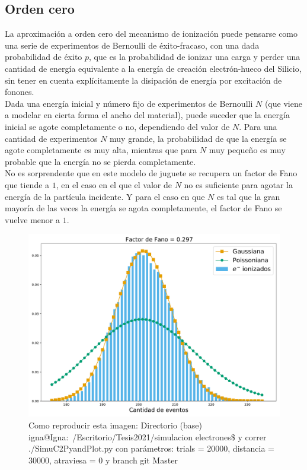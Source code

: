 \subsection{Orden cero}
\noindent La aproximación a orden cero del mecanismo de ionización puede pensarse como una serie de experimentos de Bernoulli de éxito-fracaso, con una dada probabilidad de éxito $p$, que es la probabilidad de ionizar una carga y perder una cantidad de energía equivalente a la energía de creación electrón-hueco del Silicio, sin tener en cuenta explícitamente la disipación de energía por excitación de fonones.\\
\indent Dada una energía inicial y número fijo de experimentos de Bernoulli $N$ (que viene a modelar en cierta forma el ancho del material), puede suceder que la energía inicial se agote completamente o no, dependiendo del valor de $N$. Para una cantidad de experimentos $N$ muy grande, la probabilidad de que la energía se agote completamente es muy alta, mientras que para $N$ muy pequeño es muy probable que la energía no se pierda completamente.\\
\indent No es sorprendente que en este modelo de juguete se recupera un factor de Fano que tiende a $1$, en el caso en el que el valor de $N$ no es suficiente para agotar la energía de la partícula incidente. Y para el caso en que $N$ es tal que la gran mayoría de las veces la energía se agota completamente, el factor de Fano se vuelve menor a $1$.
\begin{figure}[H]
    \centering
    \includegraphics[scale=0.35]{Figs/Orden0_fano0.pdf}
    \caption{\footnotesize{Como reproducir esta imagen: Directorio (base) igna@Igna:~/Escritorio/Tesis2021/simulacion electrones\$ y correr ./SimuC2PyandPlot.py con parámetros: trials = 20000, distancia = 30000, atraviesa = 0 y branch git Master}}
    \label{fig:SimulacionOrden0Fano0}
\end{figure}

